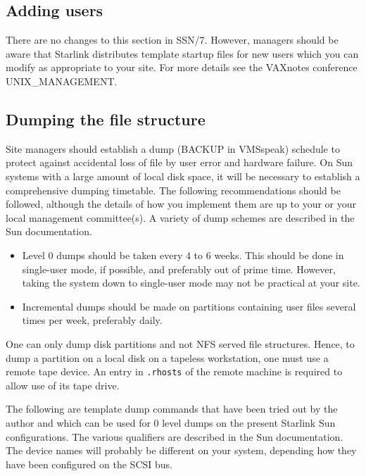 \subsection{Adding users}

There are no changes to this section in SSN/7. However, managers should
be aware that Starlink distributes template startup files for new users
which you can modify as appropriate to your site. For more details see
the VAXnotes conference UNIX\_MANAGEMENT.

\subsection{Dumping the file structure}

Site managers should establish a dump (BACKUP in VMSspeak) schedule 
to protect against accidental loss of file by user error and hardware failure. 
On Sun systems with a large amount of local disk space, it will be necessary 
to establish a comprehensive dumping timetable. The following recommendations
should be followed, although the details of how you implement them are 
up to your or your local management committee(s). A variety of dump schemes are
described in the Sun documentation. 

\begin{itemize}

\item Level 0 dumps should be taken every 4 to 6 weeks. This should be done
in single-user mode, if possible, and preferably out of prime time. However,
taking the system down to single-user mode may not be practical at your site. 

\item Incremental dumps should be made on partitions containing user files 
several times per week, preferably daily.

\end{itemize} 

One can only dump disk partitions and not NFS served file structures. Hence,
to dump a partition on a local disk on a tapeless workstation, one must use 
a remote tape device. An entry in {\tt .rhosts} of the remote machine is required
to allow use of its tape drive.

The following are template dump commands that have been tried out by the
author and which can be used for 0 level dumps on the present Starlink Sun
configurations. The various qualifiers are described  in the Sun documentation.
The device names will probably be different on your system, depending how they
have been configured on the SCSI bus. 

